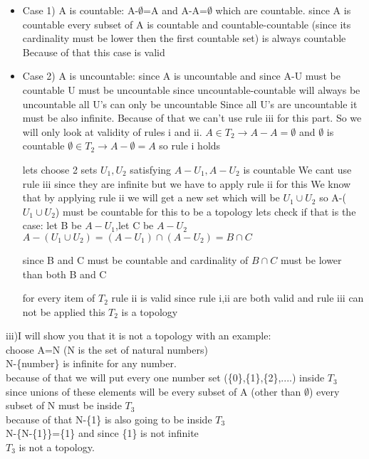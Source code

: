 \documentclass[11pt]{article}
\begin{document}
\begin{itemize}
\item Case 1) A is countable:
\subitem A-$\emptyset$=A and A-A=$\emptyset$ which are countable.
\subitem since A is countable every subset of A is countable and countable-countable (since its cardinality must be lower then the first countable set) is always countable
\subitem Because of that this case is valid

\item Case 2) A is uncountable:
\subitem since A is uncountable and since A-U must be countable U must be uncountable since uncountable-countable will always be uncountable all U's can only be uncountable
\subitem Since all U's are uncountable it must be also infinite. Because of that we can't use rule iii for this part. So we will only look at validity of rules i and ii.
\subitem $A\in T_2\rightarrow A-A=\emptyset$ and $\emptyset$ is countable 
\subitem $\emptyset\in T_2\rightarrow A-\emptyset=A$
\subitem so rule i holds

\subitem lets choose 2 sets $U_1,U_2$ satisfying $A-U_1,A-U_2$ is countable
\subitem We cant use rule iii since they are infinite but we have to apply rule ii for this
\subitem We know that by applying rule ii we will get a new set which will be $U_1\cup U_2$ so A-($U_1\cup U_2$) must be countable for this to be a topology
\subitem lets check if that is the case:
\subitem let B be $A-U_1$,let C be $A-U_2$
\subitem $A-(U_1\cup U_2)=(A-U_1)\cap(A-U_2)=B\cap C$

\subitem since B and C must be countable and cardinality of $B\cap C$ must be lower than both B and C

\subitem for every item of $T_2$ rule ii is valid
\subitem since rule i,ii are both valid and rule iii can not be applied this $T_2$ is a topology

\end{itemize}

iii)I will show you that it is not a topology with an example:\\
choose A=N (N is the set of natural numbers)\\
N-\{number\} is infinite for any number.\\
because of that we will put every one number set (\{0\},\{1\},\{2\},....) inside $T_3$\\
since unions of these elements will be every subset of A (other than $\emptyset$) every subset of N must be inside $T_3$\\
because of that N-\{1\} is also going to be inside $T_3$\\
N-\{N-\{1\}\}=\{1\} and since \{1\} is not infinite\\
$T_3$ is not a topology.
\end{document}
